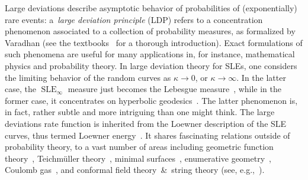 \documentclass[a4paper, 11pt]{article}
\theoremstyle{definition}
\numberwithin{equation}{section}
\numberwithin{figure}{section}
\newcommand{\SLE}[1][]{\operatorname{SLE}_{#1}}
\begin{document}
Large deviations describe asymptotic behavior of probabilities of (exponentially) rare events: 
a~\emph{large deviation principle} (LDP) refers to a concentration phenomenon associated to a collection of probability measures,
as formalized by Varadhan (see the textbooks~\cite{Deuschel-Stroock:Large_Deviations, Dembo-Zeitouni:Large_deviations_techniques_and_applications} for a thorough introduction).
Exact formulations of such phenomena are useful for many applications in, for instance, mathematical physics and probability theory.
In large deviation theory for SLEs, 
one considers the limiting behavior of the random curves as $\kappa \to 0$, or $\kappa \to \infty$. 
In the latter case, the $\SLE[\infty]$ measure just becomes the Lebesgue measure~\cite{APW:Large_deviations_of_radial_SLE_infinity},
while in the former case, it concentrates on hyperbolic 
geodesics~\cite{Dubedat:Commutation_relations_for_SLE, Wang:Energy_of_deterministic_Loewner_chain, 
Peltola-Wang:LDP}. 
The latter phenomenon is, in fact, rather subtle and more 
intriguing than one might think. 
The large deviations rate function is inherited from the Loewner description of the SLE curves, 
thus termed Loewner energy~\cite{Dubedat:Commutation_relations_for_SLE, Friz-Shekhar:Finite_energy_drivers, 
Wang:Energy_of_deterministic_Loewner_chain}.
It shares fascinating relations outside of probability theory, 
to a vast number of areas including geometric function theory~\cite{Takhtajan-Teo:Weil-Petersson_metric_on_the_universal_Teichmuller_space,Viklund-Wang:Loewner_Kufarev_energy_and_foliations_of_WP_quasicircles,Bishop:Weil_Petersson_curves_conformal_energies_beta-numbers_and_minimal_surfaces}, 
Teichm\"uller theory~\cite{Takhtajan-Teo:Weil-Petersson_metric_on_the_universal_Teichmuller_space, Wang:Equivalent_descriptions_of_Loewner_energy},
minimal surfaces~\cite{BBVW:Universal_Liouville_action_as_renormalized_volume_and_its_gradient_flow,Bishop:Weil_Petersson_curves_conformal_energies_beta-numbers_and_minimal_surfaces},
enumerative geometry~\cite{Peltola-Wang:LDP}, 
Coulomb gas~\cite{Johansson:Strong_Szego_theorem_on_a_Jordan_curve},
and conformal field theory~\&~string theory
(see, e.g.,~\cite{Bowick-Rajeev:String_theory_as_the_Kahler_geometry_of_loop_space, Takhtajan-Teo:Weil-Petersson_metric_on_the_universal_Teichmuller_space,RSS:Quasiconformal_Teichmuller_theory_as_analytical_foundation_for_CFT, Maibach-Peltola:From_the_conformal_anomaly_to_the_Virasoro_algebra, Baverez-Jego:The_CFT_of_SLE_loop_measures_and_the_Kontsevich-Suhov_conjecture}).
\end{document}
